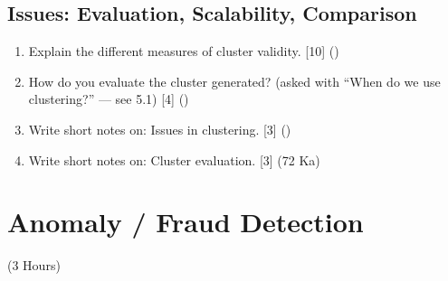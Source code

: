 \documentclass[12pt]{article}
\begin{document}
  \subsection{Issues: Evaluation, Scalability, Comparison}
    \begin{enumerate}[topsep=0pt, noitemsep]
      \item Explain the different measures of cluster validity. \hfill [10] ()

      \item How do you evaluate the cluster generated? (asked with ``When do we use clustering?'' --- see 5.1) \hfill [4] ()

      \item Write short notes on: Issues in clustering. \hfill [3] ()

      \item Write short notes on: Cluster evaluation. \hfill [3] (72 Ka)
    \end{enumerate}

\pagebreak
\section{Anomaly / Fraud Detection}
\begin{center}(3 Hours)\end{center}
\end{document}
